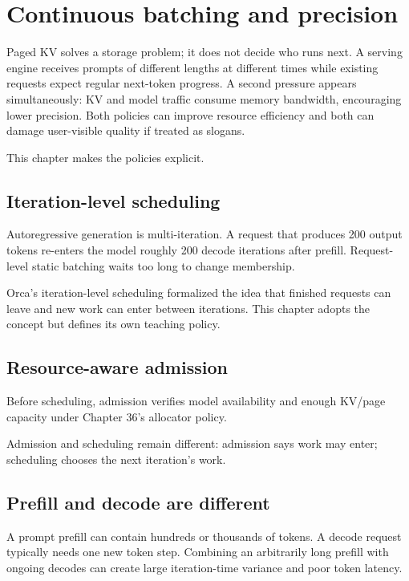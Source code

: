 \chapter{Continuous batching and precision}

Paged KV solves a storage problem; it does not decide who runs next. A serving engine receives prompts of different lengths at different times while existing requests expect regular next-token progress. A second pressure appears simultaneously: KV and model traffic consume memory bandwidth, encouraging lower precision. Both policies can improve resource efficiency and both can damage user-visible quality if treated as slogans.

This chapter makes the policies explicit.

\section{Iteration-level scheduling}
Autoregressive generation is multi-iteration. A request that produces 200 output tokens re-enters the model roughly 200 decode iterations after prefill. Request-level static batching waits too long to change membership.

Orca's iteration-level scheduling formalized the idea that finished requests can leave and new work can enter between iterations. This chapter adopts the concept but defines its own teaching policy.

\section{Resource-aware admission}
Before scheduling, admission verifies model availability and enough KV/page capacity under Chapter 36's allocator policy.

Admission and scheduling remain different: admission says work may enter; scheduling chooses the next iteration's work.

\section{Prefill and decode are different}
A prompt prefill can contain hundreds or thousands of tokens. A decode request typically needs one new token step. Combining an arbitrarily long prefill with ongoing decodes can create large iteration-time variance and poor token latency.

